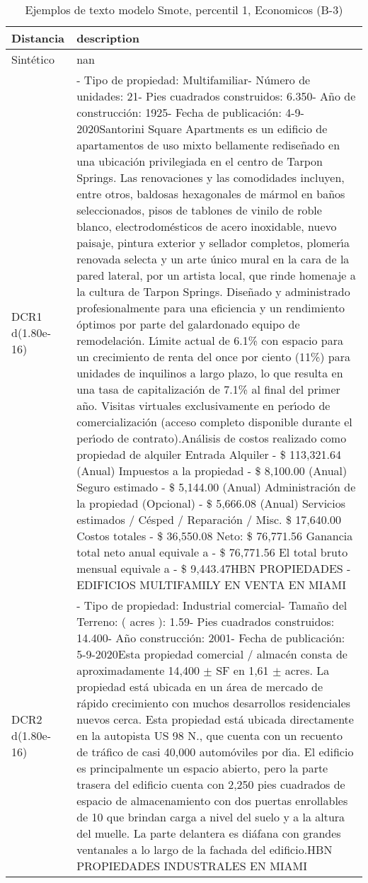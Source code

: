 \begin{table}[H]
\centering
\fontsize{10}{14}\selectfont
\caption{Ejemplos de texto modelo Smote, percentil 1, Economicos (B-3)}
\label{table-example-economicos-b-3-smote-enc-1p-text}
\begin{tabular}{|l|m{35em}|}
\hline
\rowcolor[gray]{0.8}
Distancia & description \\
\hline Sintético & nan \\
\hline DCR1 d(1.80e-16) & - Tipo de propiedad: Multifamiliar- N\'umero de unidades: 21- Pies cuadrados construidos: 6.350- A\~no de construcci\'on: 1925- Fecha de publicaci\'on: 4-9-2020Santorini Square Apartments es un edificio de apartamentos de uso mixto bellamente redise\~nado en una ubicaci\'on privilegiada en el centro de Tarpon Springs. Las renovaciones y las comodidades incluyen, entre otros, baldosas hexagonales de m\'armol en ba\~nos seleccionados, pisos de tablones de vinilo de roble blanco, electrodom\'esticos de acero inoxidable, nuevo paisaje, pintura exterior y sellador completos, plomer{\'\i}a renovada selecta y un arte \'unico mural en la cara de la pared lateral, por un artista local, que rinde homenaje a la cultura de Tarpon Springs. Dise\~nado y administrado profesionalmente para una eficiencia y un rendimiento \'optimos por parte del galardonado equipo de remodelaci\'on. L{\'\i}mite actual de 6.1\% con espacio para un crecimiento de renta del once por ciento (11\%) para unidades de inquilinos a largo plazo, lo que resulta en una tasa de capitalizaci\'on de 7.1\% al final del primer a\~no. Visitas virtuales exclusivamente en per{\'\i}odo de comercializaci\'on (acceso completo disponible durante el per{\'\i}odo de contrato).An\'alisis de costos realizado como propiedad de alquiler Entrada Alquiler - \$ 113,321.64 (Anual) Impuestos a la propiedad - \$ 8,100.00 (Anual) Seguro estimado - \$ 5,144.00 (Anual) Administraci\'on de la propiedad (Opcional) - \$ 5,666.08 (Anual) Servicios estimados / C\'esped / Reparaci\'on / Misc. \$ 17,640.00 Costos totales - \$ 36,550.08 Neto: \$ 76,771.56 Ganancia total neto anual equivale a - \$ 76,771.56 El total bruto mensual equivale a - \$ 9,443.47HBN PROPIEDADES - EDIFICIOS MULTIFAMILY EN VENTA EN MIAMI \\
\hline DCR2 d(1.80e-16) & - Tipo de propiedad: Industrial comercial- Tama\~no del Terreno: ( acres ): 1.59- Pies cuadrados construidos: 14.400- A\~no construcci\'on: 2001- Fecha de publicaci\'on: 5-9-2020Esta propiedad comercial / almac\'en consta de aproximadamente 14,400 \ensuremath{\pm} SF en 1,61 \ensuremath{\pm} acres. La propiedad est\'a ubicada en un \'area de mercado de r\'apido crecimiento con muchos desarrollos residenciales nuevos cerca. Esta propiedad est\'a ubicada directamente en la autopista US 98 N., que cuenta con un recuento de tr\'afico de casi 40,000 autom\'oviles por d{\'\i}a. El edificio es principalmente un espacio abierto, pero la parte trasera del edificio cuenta con 2,250 pies cuadrados de espacio de almacenamiento con dos puertas enrollables de 10 que brindan carga a nivel del suelo y a la altura del muelle. La parte delantera es di\'afana con grandes ventanales a lo largo de la fachada del edificio.HBN PROPIEDADES INDUSTRALES EN MIAMI \\
\hline
\end{tabular}
\end{table}
